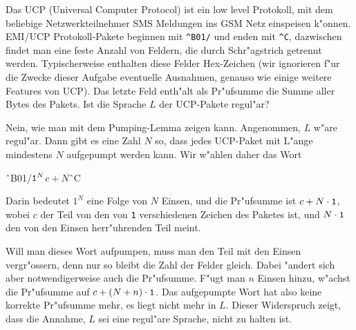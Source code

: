 Das UCP (Universal Computer Protocol) ist ein low level Protokoll,
mit dem beliebige Netzwerkteilnehmer SMS Meldungen ins GSM Netz einspeisen
k"onnen.
EMI/UCP Protokoll-Pakete beginnen mit \verb+^B01/+  und enden mit \verb+^C+,
dazwischen findet man eine feste Anzahl von Feldern, die durch
Schr"agstrich getrennt werden. Typischerweise enthalten diese
Felder Hex-Zeichen (wir ignorieren f"ur die Zwecke dieser Aufgabe
eventuelle Ausnahmen, genauso wie einige weitere Features von UCP).
Das letzte Feld enth"alt als Pr"ufsumme die
Summe aller Bytes des Pakets. Ist die Sprache $L$ der UCP-Pakete 
regul"ar?

\begin{loesung}
Nein, wie man mit dem Pumping-Lemma zeigen kann.
Angenommen, $L$ w"are regul"ar. Dann gibt es eine Zahl $N$ so,
dass jedes UCP-Paket mit L"ange mindestens $N$ aufgepumpt werden
kann. Wir w"ahlen daher das Wort 
\begin{center}
\^\ B01/$\text{\tt 1}^N$\text{/////}$c+N$\^\ C
\end{center}
Darin bedeutet $\text{1}^N$ eine Folge von $N$ Einsen, und die Pr"ufsumme
ist $c+N\cdot{\tt 1}$, wobei $c$ der Teil von den von {\tt 1}
verschiedenen Zeichen des Paketes ist, und $N\cdot\text{\tt 1}$
den von den Einsen herr"uhrenden Teil meint.

Will man dieses Wort aufpumpen, muss man den Teil mit den Einsen
vergr"ossern, denn nur so bleibt die Zahl der Felder gleich. Dabei
"andert sich aber notwendigerweise auch die Pr"ufsumme. F"ugt
man $n$ Einsen hinzu, w"achst die Pr"ufsumme auf 
$c+(N+n)\cdot{\tt 1}$. Das aufgepumpte Wort hat also keine korrekte
Pr"ufsumme mehr, es liegt nicht mehr in $L$. Dieser Widerspruch
zeigt, dass die Annahme, $L$ sei eine regul"are Sprache, nicht zu
halten ist.
\end{loesung}
